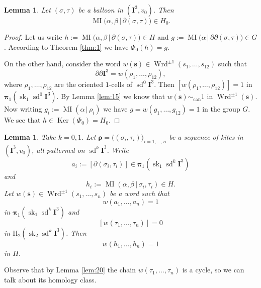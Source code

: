\documentclass[10pt, a4paper]{amsart}
\newtheorem{lem}[equation]{Lemma}
\theoremstyle{definition}
\numberwithin{equation}{section}
\newcommand{\opn}{\operatorname}
\newcommand{\mbf}[1]{\mathbf{#1}}
\newcommand{\mrm}[1]{\mathrm{#1}}
\newcommand{\bsym}[1]{\boldsymbol{#1}}
\renewcommand{\vert}{\, | \,}
\begin{document}
\begin{lem} \label{lem:23}
Let $(\sigma, \tau)$ be a balloon in $(\mbf{I}^3, v_0)$. Then 
\[ \opn{MI} \bigl( \alpha, \beta \vert \partial (\sigma, \tau) \bigr)
\in H_0 . \]
\end{lem}

\begin{proof}
Let us write
$h := \opn{MI} \bigl( \alpha, \beta \vert \partial (\sigma, \tau) \bigr) \in H$
and 
$g := \opn{MI} \bigl( \alpha \vert \partial \partial (\sigma, \tau) \bigr) \in
G$.
According to Theorem \ref{thm:1} we have 
$\Phi_0(h) = g$. 

On the other hand, consider the word
$w(\bsym{s}) \in \opn{Wrd}^{\pm 1}(s_1, \ldots, s_{12})$ such that 
\[ \partial \partial \mbf{I}^3 = w(\rho_1, \ldots, \rho_{12}) , \]
where $\rho_1, \ldots, \rho_{12}$ are the oriented $1$-cells of 
$\opn{sd}^0 \mbf{I}^3$. Then 
$[w(\rho_1, \ldots, \rho_{12})] = 1$ in \linebreak
$\bsym{\pi}_1(\opn{sk}_1 \opn{sd}^0 \mbf{I}^3)$. 
By Lemma \ref{lem:15} we know that
$w(\bsym{s}) \sim_{\mrm{can}} 1$ in $\opn{Wrd}^{\pm 1}(\bsym{s})$. 
Now writing $g_i := \opn{MI}(\alpha \vert \rho_i)$
we have
$g = w(g_1, \ldots, g_{12}) = 1$ in the group $G$. 
We see that 
$h \in  \opn{Ker}(\Phi_0) = H_0$.
\end{proof}

\begin{lem} \label{lem:24}
Take $k = 0, 1$. Let 
$\bsym{\rho} = \bigl( (\sigma_i, \tau_i) \bigr)_{i = 1, \ldots, n}$
be a sequence of kites in $(\mbf{I}^{3}, v_0)$, all patterned on 
$\opn{sd}^k \mbf{I}^3$. Write
\[ a_i := [\partial (\sigma_i, \tau_i)] \in 
\bsym{\pi}_1(\opn{sk}_1 \opn{sd}^k \mbf{I}^3) \]
and 
\[ h_i := \opn{MI} (\alpha, \beta \vert \sigma_i, \tau_i) \in H . \]
Let $w(\bsym{s}) \in \opn{Wrd}^{\pm 1}(s_1, \ldots, s_n)$ be a word such that
\[ w(a_1, \ldots, a_n) = 1 \]
in $\bsym{\pi}_1(\opn{sk}_1 \opn{sd}^k \mbf{I}^3)$ and
\[ [ w(\tau_1, \ldots, \tau_n) ] = 0 \]
in $\mrm{H}_2(\opn{sk}_2 \opn{sd}^k \mbf{I}^3)$. Then
\[ w(h_1, \ldots, h_n) = 1 \]
in $H$.
\end{lem}

Observe that by Lemma \ref{lem:20} the chain 
$w(\tau_1, \ldots, \tau_n)$ is a cycle, so we can talk about its homology class.
\end{document}
